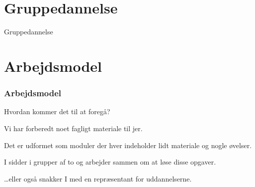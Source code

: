 
\section{Gruppedannelse}
\begin{frame}
  \vspace{32mm}
  \begin{center}
    \Huge{Gruppedannelse}
  \end{center}
\end{frame}

\section{Arbejdsmodel}
\begin{frame}
  \frametitle{Arbejdsmodel}
  \vspace{3mm}
  Hvordan kommer det til at foregå?
  
  \pause
  \vspace{5mm}
  Vi har forberedt noet fagligt materiale til jer.
  
  \pause
  \vspace{5mm}
  Det er udformet som moduler der hver indeholder lidt materiale og nogle øvelser.
  
  \pause
  \vspace{5mm}
  I sidder i grupper af to og arbejder sammen om at løse disse opgaver.
  
  \pause
  \vspace{5mm}
  \ldots eller også snakker I med en repræsentant for uddannelserne.
\end{frame}

